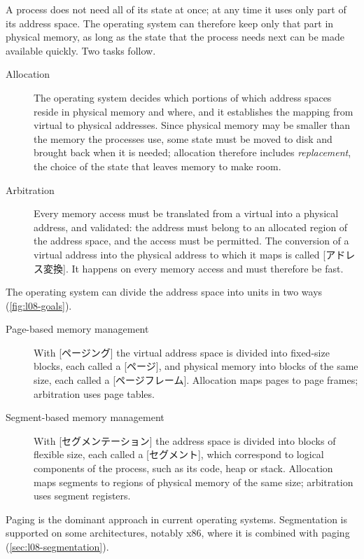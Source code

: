 \documentclass[../main.tex]{subfiles}
\begin{document}
A process does not need all of its state at once; at any time it uses only
part of its address space.  The operating system can therefore keep only
that part in physical memory, as long as the state that the process needs
next can be made available quickly.  Two tasks follow.
\begin{description}
  \item[Allocation] The operating system decides which portions of which
    address spaces reside in physical memory and where, and it establishes
    the mapping from virtual to physical addresses.  Since physical memory
    may be smaller than the memory the processes use, some state must be
    moved to disk and brought back when it is needed; allocation therefore
    includes \emph{replacement}, the choice of the state that leaves
    memory to make room.
  \item[Arbitration] Every memory access must be translated from a virtual
    into a physical address, and validated: the address must belong to an
    allocated region of the address space, and the access must be
    permitted.  The conversion of a virtual address into the physical
    address to which it maps is called
    [アドレス変換].  It happens on every memory
    access and must therefore be fast.
\end{description}

The operating system can divide the address space into units in two ways
(\cref{fig:l08-goals}).
\begin{description}
  \item[Page-based memory management] With [ページング] the
    virtual address space is divided into fixed-size blocks, each called a
    [ページ], and physical memory into blocks of the same size,
    each called a [ページフレーム].  Allocation maps pages
    to page frames; arbitration uses page tables.
  \item[Segment-based memory management] With
    [セグメンテーション] the address space is divided
    into blocks of flexible size, each called a
    [セグメント], which correspond to logical components of
    the process, such as its code, heap or stack.  Allocation maps segments
    to regions of physical memory of the same size; arbitration uses
    segment registers.
\end{description}
Paging is the dominant approach in current operating systems.  Segmentation
is supported on some architectures, notably x86, where it is combined with
paging (\cref{sec:l08-segmentation}).
\end{document}
